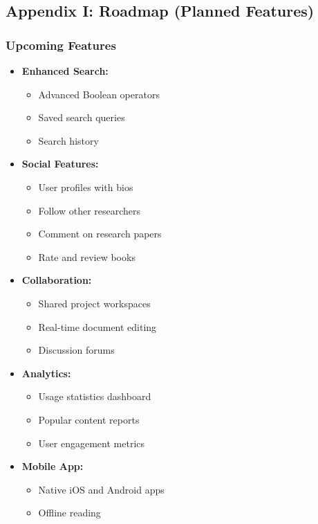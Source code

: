 \documentclass[12pt,a4paper]{article}
\begin{document}
\subsection{Appendix I: Roadmap (Planned Features)}

\subsubsection{Upcoming Features}
\begin{itemize}[leftmargin=*]
    \item \textbf{Enhanced Search:}
        \begin{itemize}
            \item Advanced Boolean operators
            \item Saved search queries
            \item Search history
        \end{itemize}
    \item \textbf{Social Features:}
        \begin{itemize}
            \item User profiles with bios
            \item Follow other researchers
            \item Comment on research papers
            \item Rate and review books
        \end{itemize}
    \item \textbf{Collaboration:}
        \begin{itemize}
            \item Shared project workspaces
            \item Real-time document editing
            \item Discussion forums
        \end{itemize}
    \item \textbf{Analytics:}
        \begin{itemize}
            \item Usage statistics dashboard
            \item Popular content reports
            \item User engagement metrics
        \end{itemize}
    \item \textbf{Mobile App:}
        \begin{itemize}
            \item Native iOS and Android apps
            \item Offline reading

\end{itemize}
\end{itemize}
\end{document}
